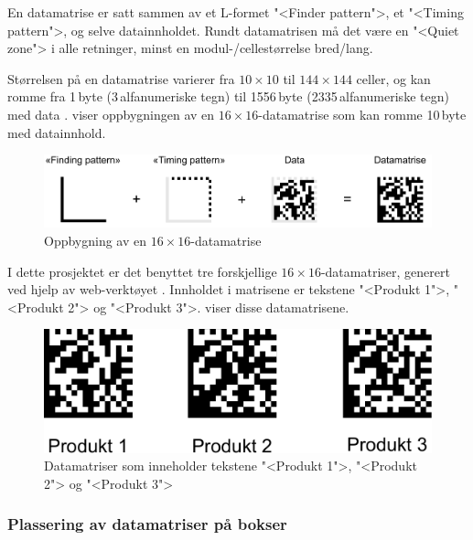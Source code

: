 \documentclass[Visionprosjekt.tex]{subfiles}
\begin{document}
En datamatrise er satt sammen  av et L-formet "<Finder pattern">, et "<Timing pattern">, og selve datainnholdet. Rundt datamatrisen må det være en "<Quiet zone"> i alle retninger, minst en modul-/cellestørrelse bred/lang. \cite{iso16022}

Størrelsen på en datamatrise varierer fra $10\times10$ til $144\times144$ celler, og kan romme fra 1\,byte (3\,alfanumeriske tegn) til 1556\,byte (2335\,alfanumeriske tegn) med data \cite{IDautomation}.  viser oppbygningen av en $16\times16$-datamatrise som kan romme 10\,byte med datainnhold.


\begin{figure}[ht]
	\centering
		\includegraphics[scale=1]{bilder/datamatrise.pdf}
	\caption{Oppbygning av en $16\times16$-datamatrise}
	\label{fig:datamatrise}
\end{figure}


I dette prosjektet er det benyttet tre forskjellige $16\times16$-datamatriser, generert ved hjelp av web-verktøyet \cite{DataMartixGenerator}. Innholdet i matrisene er tekstene "<Produkt 1">, "<Produkt 2"> og "<Produkt 3">.  viser disse datamatrisene.

\begin{figure}
	\centering
		\includegraphics[scale=1]{bilder/datamatriser.pdf}
	\caption{Datamatriser som inneholder tekstene "<Produkt 1">, "<Produkt 2"> og "<Produkt 3">}
	\label{fig:datamatriser}
\end{figure}










\subsubsection{Plassering av datamatriser på bokser}
\end{document}
